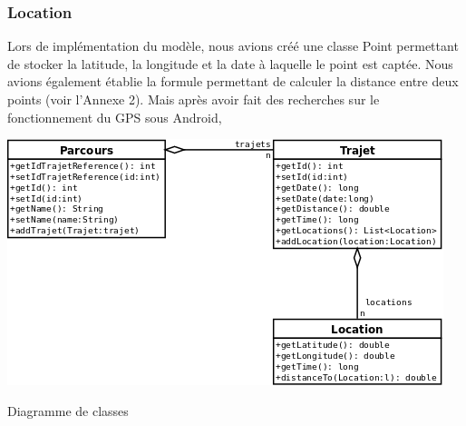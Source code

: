 \subsubsection{Location}
Lors de implémentation du modèle, nous avions créé une classe Point permettant de stocker la latitude, la longitude et la date à laquelle le point est captée. Nous avions également établie la formule permettant de calculer la distance entre deux points (voir l'Annexe 2). Mais après avoir fait des recherches sur le fonctionnement du GPS sous Android, 
\begin{img}
  \includegraphics[scale=0.5]{img/DiagrammeDeClasse.png}
  \caption{Diagramme de classes}
\end{img}
